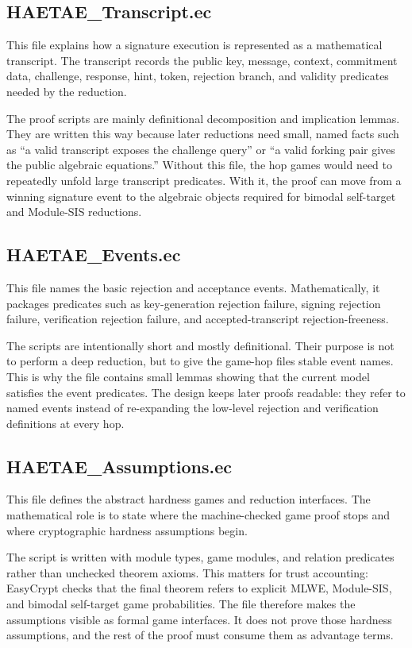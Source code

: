 \documentclass[11pt]{article}
\begin{document}
\subsection*{HAETAE\_Transcript.ec}

This file explains how a signature execution is represented as a mathematical
transcript.  The transcript records the public key, message, context,
commitment data, challenge, response, hint, token, rejection branch, and
validity predicates needed by the reduction.

The proof scripts are mainly definitional decomposition and implication lemmas.
They are written this way because later reductions need small, named facts such
as ``a valid transcript exposes the challenge query'' or ``a valid forking pair
gives the public algebraic equations.''  Without this file, the hop games would
need to repeatedly unfold large transcript predicates.  With it, the proof can
move from a winning signature event to the algebraic objects required for
bimodal self-target and Module-SIS reductions.

\subsection*{HAETAE\_Events.ec}

This file names the basic rejection and acceptance events.  Mathematically, it
packages predicates such as key-generation rejection failure, signing rejection
failure, verification rejection failure, and accepted-transcript
rejection-freeness.

The scripts are intentionally short and mostly definitional.  Their purpose is
not to perform a deep reduction, but to give the game-hop files stable event
names.  This is why the file contains small lemmas showing that the current
model satisfies the event predicates.  The design keeps later proofs readable:
they refer to named events instead of re-expanding the low-level rejection and
verification definitions at every hop.

\subsection*{HAETAE\_Assumptions.ec}

This file defines the abstract hardness games and reduction interfaces.  The
mathematical role is to state where the machine-checked game proof stops and
where cryptographic hardness assumptions begin.

The script is written with module types, game modules, and relation predicates
rather than unchecked theorem axioms.  This matters for trust accounting:
EasyCrypt checks that the final theorem refers to explicit MLWE, Module-SIS,
and bimodal self-target game probabilities.  The file therefore makes the
assumptions visible as formal game interfaces.  It does not prove those
hardness assumptions, and the rest of the proof must consume them as advantage
terms.
\end{document}
